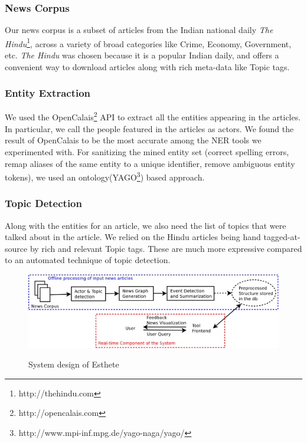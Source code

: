 \subsubsection*{News Corpus}
Our news corpus is a subset of articles from the Indian national daily {\em The Hindu}\footnote{http://thehindu.com}, across a variety of broad categories like Crime, Economy, Government, etc. 
{\em The Hindu} was chosen because it is a popular Indian daily, and offers a convenient way to download articles along with rich meta-data like Topic tags.

\subsubsection*{Entity Extraction}
We used the OpenCalais\footnote{http://opencalais.com} API to extract all the entities appearing in the articles. In particular, we call
the people featured in the articles as actors. We found the result of OpenCalais to be the most accurate among the NER tools we experimented with.
For sanitizing the mined entity set (correct spelling errors, remap aliases of the same entity to a unique identifier, remove ambiguous entity tokens),
we used an ontology(YAGO\footnote{http://www.mpi-inf.mpg.de/yago-naga/yago/}) based approach.

\subsubsection*{Topic Detection}
Along with the entities for an article, we also need the list of topics that were talked about in the article. 
We relied on the Hindu articles being hand tagged-at-source by rich and relevant Topic tags. These are much more expressive compared to an automated technique of topic detection.
\begin{figure}
\caption{System design of Esthete}
\includegraphics[scale=0.24]{figures/system-design.pdf}
\label{fig:block-system-design}
\end{figure}


